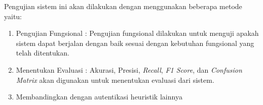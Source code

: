 Pengujian sistem ini akan dilakukan dengan menggunakan beberapa metode yaitu:
\begin{enumerate}
    \item Pengujian Fungsional : Pengujian fungsional dilakukan untuk menguji apakah sistem dapat berjalan dengan baik sesuai dengan kebutuhan fungsional yang telah ditentukan.
    \item Menentukan Evaluasi : Akurasi, Presisi, \textit{Recall}, \textit{F1 Score}, dan \textit{Confusion Matrix} akan digunakan untuk menentukan evaluasi dari sistem.
    \item Membandingkan dengan autentikasi heuristik lainnya
\end{enumerate}
